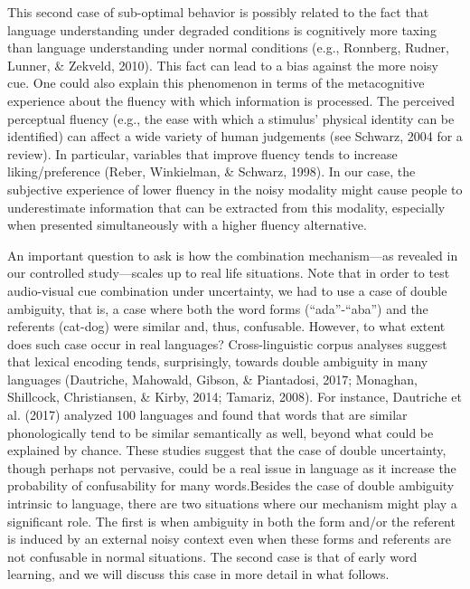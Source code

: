 \documentclass[english,floatsintext,man]{apa6}
\theoremstyle{definition}
\theoremstyle{definition}
\theoremstyle{definition}
\theoremstyle{remark}
\begin{document}
This second case of sub-optimal behavior is possibly related to the fact
that language understanding under degraded conditions is cognitively
more taxing than language understanding under normal conditions (e.g.,
Ronnberg, Rudner, Lunner, \& Zekveld, 2010). This fact can lead to a
bias against the more noisy cue. One could also explain this phenomenon
in terms of the metacognitive experience about the fluency with which
information is processed. The perceived perceptual fluency (e.g., the
ease with which a stimulus' physical identity can be identified) can
affect a wide variety of human judgements (see Schwarz, 2004 for a
review). In particular, variables that improve fluency tends to increase
liking/preference (Reber, Winkielman, \& Schwarz, 1998). In our case,
the subjective experience of lower fluency in the noisy modality might
cause people to underestimate information that can be extracted from
this modality, especially when presented simultaneously with a higher
fluency alternative.

An important question to ask is how the combination mechanism---as
revealed in our controlled study---scales up to real life situations.
Note that in order to test audio-visual cue combination under
uncertainty, we had to use a case of double ambiguity, that is, a case
where both the word forms (\enquote{ada}-\enquote{aba}) and the
referents (cat-dog) were similar and, thus, confusable. However, to what
extent does such case occur in real languages? Cross-linguistic corpus
analyses suggest that lexical encoding tends, surprisingly, towards
double ambiguity in many languages (Dautriche, Mahowald, Gibson, \&
Piantadosi, 2017; Monaghan, Shillcock, Christiansen, \& Kirby, 2014;
Tamariz, 2008). For instance, Dautriche et al. (2017) analyzed 100
languages and found that words that are similar phonologically tend to
be similar semantically as well, beyond what could be explained by
chance. These studies suggest that the case of double uncertainty,
though perhaps not pervasive, could be a real issue in language as it
increase the probability of confusability for many
words.\linebreak Besides the case of double ambiguity intrinsic to
language, there are two situations where our mechanism might play a
significant role. The first is when ambiguity in both the form and/or
the referent is induced by an external noisy context even when these
forms and referents are not confusable in normal situations. The second
case is that of early word learning, and we will discuss this case in
more detail in what follows.
\end{document}
